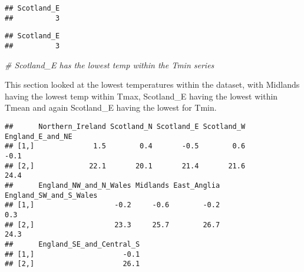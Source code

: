 \documentclass[
]{article}
\newenvironment{Shaded}{\begin{snugshade}}{\end{snugshade}}
\newcommand{\AttributeTok}[1]{\textcolor[rgb]{0.77,0.63,0.00}{#1}}
\newcommand{\CommentTok}[1]{\textcolor[rgb]{0.56,0.35,0.01}{\textit{#1}}}
\newcommand{\ConstantTok}[1]{\textcolor[rgb]{0.00,0.00,0.00}{#1}}
\newcommand{\ControlFlowTok}[1]{\textcolor[rgb]{0.13,0.29,0.53}{\textbf{#1}}}
\newcommand{\FunctionTok}[1]{\textcolor[rgb]{0.00,0.00,0.00}{#1}}
\newcommand{\NormalTok}[1]{#1}
\newcommand{\OtherTok}[1]{\textcolor[rgb]{0.56,0.35,0.01}{#1}}
\newcommand{\SpecialCharTok}[1]{\textcolor[rgb]{0.00,0.00,0.00}{#1}}
\begin{document}
\begin{verbatim}
## Scotland_E 
##          3
\end{verbatim}

\begin{Shaded}
\end{Shaded}

\begin{verbatim}
## Scotland_E 
##          3
\end{verbatim}

\begin{Shaded}
\begin{Highlighting}[]
\CommentTok{\# Scotland\_E has the lowest temp within the Tmin series}
\end{Highlighting}
\end{Shaded}

This section looked at the lowest temperatures within the dataset, with
Midlands having the lowest temp within Tmax, Scotland\_E having the
lowest within Tmean and again Scotland\_E having the lowest for Tmin.

\begin{Shaded}
\end{Shaded}

\begin{verbatim}
##      Northern_Ireland Scotland_N Scotland_E Scotland_W England_E_and_NE
## [1,]              1.5        0.4       -0.5        0.6             -0.1
## [2,]             22.1       20.1       21.4       21.6             24.4
##      England_NW_and_N_Wales Midlands East_Anglia England_SW_and_S_Wales
## [1,]                   -0.2     -0.6        -0.2                    0.3
## [2,]                   23.3     25.7        26.7                   24.3
##      England_SE_and_Central_S
## [1,]                     -0.1
## [2,]                     26.1
\end{verbatim}
\end{document}
